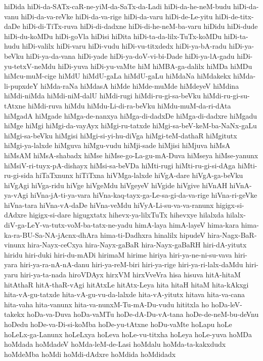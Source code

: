 {hiDida
hiDi-da-SATx-caR-ne-yiM-da-SaTx-da-Ladi
hiDi-da-he-neM-budu
hiDi-da-vanu
hiDi-da-va-reVke
hiDi-da-va-rige
hiDi-da-varu
hiDi-de-Le-yitu
hiDi-de-titx-daDe
hiDi-di-TiTx-ruva
hiDi-di-dadxne
hiDi-di-he-neM-ba-varu
hiDidu
hiDi-dude
hiDi-du-koMDu
hiDi-goVla
hiDisi
hiDita
hiDi-ta-da-lilx-TuTx-koMDu
hiDi-ta-hudu
hiDi-valilx
hiDi-varu
hiDi-vudu
hiDi-vu-titxdedx
hiDi-ya-bA-radu
hiDi-ya-beVku
hiDi-ya-da-vana
hiDi-yade
hiDi-ya-doV-vi-bi-Dade
hiDi-ya-lA-gadu
hiDi-yu-tetxV-neMdu
hiDi-yuva
hiDi-yu-vaMte
hiM
hiMBA-ga-dalilx
hiMDa
hiMDu
hiMcu-muM-cige
hiMdU
hiMdU-gaLa
hiMdU-gaLu
hiMdaNa
hiMdakekx
hiMda-li-pupxdeY
hiMda-raNa
hiMdasA
hiMde
hiMde-muMde
hiMdeyeV
hiMdina
hiMdi-niMda
hiMdi-niM-dalU
hiMdi-rugi
hiMdi-ru-gi-sa-beVku
hiMdi-ru-gi-su-tAtxne
hiMdi-ruva
hiMdu
hiMdu-Li-di-ra-beVku
hiMdu-muM-da-ri-dAta
hiMgadA
hiMgade
hiMga-de-nanxya
hiMga-di-dadxDe
hiMga-di-dadxre
hiMgadu
hiMge
hiMgi
hiMgi-da-vayAyx
hiMgi-ru-tatxde
hiMgi-sa-beV-keM-ba-NaNx-gaLu
hiMgi-sa-beVku
hiMgisi
hiMgi-si-yi-hu-diVga
hiMgi-teM-dathaR
hiMgitutx
hiMgi-ya-lalxde
hiMguva
hiMgu-vudu
hiMji-sade
hiMjisi
hiMjuva
hiMsA
hiMsAM
hiMsA-shabadx
hiMse
hiMse-go-La-gu-mA-Duva
hiMseya
hiMse-yanunx
hiMsiV-ri-tuyx-pA-dishayx
hiMsi-sa-beVDa
hiMti-rugi
hiMti-ru-gi-si-dAga
hiMti-ru-gi-sida
hiTaTxnunx
hiTiTxna
hiVMga-lalxde
hiVgA-dare
hiVgA-ga-beVku
hiVgAgi
hiVga-ridu
hiVge
hiVgeMdu
hiVgeyeV
hiVgide
hiVgive
hiVnAH
hiVnA-ya-vAgi
hiVna-jA-ti-ya-vara
hiVna-kaq-tayx-ga-Le-sa-gi-da-va-rige
hiVna-ri-geVke
hiVna-tara
hiVna-vA-daDe
hiVna-veMdu
hiVyA-Li-su-va-va-ranunx
higigx-si-dAdxre
higigx-si-dare
higugxtatx
hihevx-ya-lilxTuTx
hihevxye
hilalxda
hilalx-diV-ga-LeY-va-tutx-voM-ba-tatx-ne-yadu
himA-laya
himA-layeV
hima-kara
hima-ka-ra-BU-Sa-NA-jAcnx-dhAra
hima-ti-Dadhxra
hinalilx
hipudeV
hira-Nagx-BaR-vinunx
hira-Nayx-ceCxya
hira-Nayx-gaBaR
hira-Nayx-gaBaRH
hiri-dA-yitutx
hiridu
hiri-duki
hiri-du-mADi
hirimaM
hirime
hiriya
hiri-ya-ne-ni-su-vava
hiri-yara
hiri-ya-ra-nA-nA-danu
hiri-ya-reM-biri
hiri-ya-rige
hiri-ya-ri-lalx-daMdu
hiri-yaru
hiri-ya-ta-nada
hiroVDAyx
hirxVM
hirxVveVra
hisa
hisuva
hitA-hitaM
hitAthaR
hitA-thaR-vAgi
hitAtxLe
hitAtx-Leya
hita
hitaH
hitaM
hita-kAkxgi
hita-vA-gu-tatxde
hita-vA-gu-vu-da-lalxde
hita-vA-yitutx
hitava
hita-va-cana
hita-vaha
hita-vanunx
hita-va-nunxM-Tu-mA-Du-vudu
hititxla
ho
hoDa-leV-takekx
hoDa-va-Duva
hoDa-vaMTu
hoDe-dA-Du-vA-tana
hoDe-de-neM-bu-deVnu
hoDedu
hoDe-va-Di-si-koMba
hoDe-yu-tAtxne
hoDu-vaMte
hoLapu
hoLe
hoLeLx-ga-Lanunx
hoLeLxya
hoLeva
hoLe-vu-titxha
hoLeya
hoLe-yuva
hoMDa
hoMdada
hoMdadeV
hoMda-leM-de-Lasi
hoMdalu
hoMda-ta-kakxdudx
hoMdeMba
hoMdi
hoMdi-dAdxre
hoMdida
hoMdidadx
}

